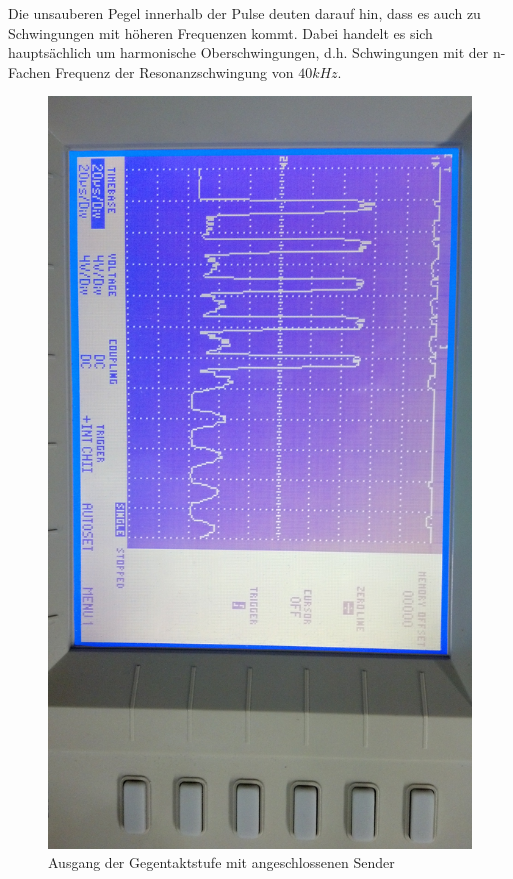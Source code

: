 Die unsauberen Pegel innerhalb der Pulse deuten darauf hin, dass es auch zu Schwingungen mit höheren Frequenzen kommt. Dabei handelt es sich hauptsächlich um harmonische Oberschwingungen, d.h. Schwingungen mit der n-Fachen Frequenz der Resonanzschwingung von $40 kHz$. %
\begin{figure}[H]
\centering
\includegraphics[width=(\textwidth), angle=90]{oszi/15-04-16/3.jpg} %
\caption{Ausgang der Gegentaktstufe mit angeschlossenen Sender} \label{img:I6}
\end{figure}

